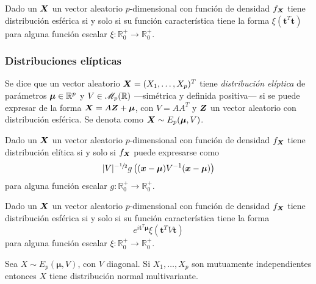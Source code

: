 \begin{nprop}
  Dado un $\boldsymbol{X}$ un vector aleatorio $p$-dimensional con función de densidad $f_{\boldsymbol{X}}$ tiene distribución esférica si y solo si su función característica tiene la forma $\xi(\boldsymbol t^T \boldsymbol t)$ para alguna función escalar $\xi: \mathbb R_0^+ \to \mathbb R_0^+$.
\end{nprop}

\subsubsection{Distribuciones elípticas}

\begin{ndef}
  Se dice que un vector aleatorio $\boldsymbol{X} = (X_1, \dots, X_p)^T$ tiene \textit{distribución elíptica} de parámetros $\boldsymbol \mu\in\mathbb{R}^p$ y $V\in\mathscr{M}_p(\mathbb{R})$ —simétrica y definida positiva— si se puede expresar de la forma $\boldsymbol{X} = A\boldsymbol{Z} + \boldsymbol \mu$, con $V = AA^T$ y $\boldsymbol{Z}$ un vector aleatorio con distribución esférica. Se denota como $\boldsymbol{X} \sim E_p(\boldsymbol \mu, V)$.
\end{ndef}

\begin{nprop}
  Dado un $\boldsymbol{X}$ un vector aleatorio $p$-dimensional con función de densidad $f_{\boldsymbol{X}}$ tiene distribución elítica si y solo si $f_{\boldsymbol{X}}$ puede expresarse como \[|V|^{-\sfrac{1}{2}}g\left((\boldsymbol x - \boldsymbol \mu)V^{-1}(\boldsymbol x - \boldsymbol \mu)\right)\] para alguna función escalar $g : \mathbb R_0^+ \to \mathbb R_0^+$.
\end{nprop}

\begin{nprop}
  Dado un $\boldsymbol{X}$ un vector aleatorio $p$-dimensional con función de densidad $f_{\boldsymbol{X}}$ tiene distribución esférica si y solo si su función característica tiene la forma \[e^{i \boldsymbol t^T \boldsymbol \mu}\xi(\boldsymbol t^T V \boldsymbol t)\] para alguna función escalar $\xi: \mathbb R_0^+ \to \mathbb R_0^+$.
\end{nprop}


\begin{nprop}
  Sea $X \sim E_p(\boldsymbol \mu, V)$, con $V$ diagonal. Si $X_1, \dots, X_p$ son mutuamente independientes entonces $X$ tiene distribución normal multivariante.
\end{nprop}

